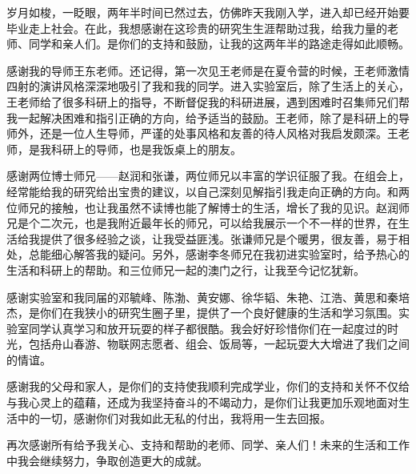 \begin{thanks}
岁月如梭，一眨眼，两年半时间已然过去，仿佛昨天我刚入学，进入却已经开始要毕业走上社会。在此，我想感谢在这珍贵的研究生生涯帮助过我，给我力量的老师、同学和亲人们。是你们的支持和鼓励，让我的这两年半的路途走得如此顺畅。

感谢我的导师王东老师。还记得，第一次见王老师是在夏令营的时候，王老师激情四射的演讲风格深深地吸引了我和我的同学。进入实验室后，除了生活上的关心，王老师给了很多科研上的指导，不断督促我的科研进展，遇到困难时召集师兄们帮我一起解决困难和指引正确的方向，给予适当的鼓励。王老师，除了是科研上的导师外，还是一位人生导师，严谨的处事风格和友善的待人风格对我启发颇深。王老师，是我科研上的导师，也是我饭桌上的朋友。

感谢两位博士师兄——赵润和张谦，两位师兄以丰富的学识征服了我。在组会上，经常能给我的研究给出宝贵的建议，以自己深刻见解指引我走向正确的方向。和两位师兄的接触，也让我虽然不读博也能了解博士的生活，增长了我的见识。赵润师兄是个二次元，也是我附近最年长的师兄，可以给我展示一个不一样的世界，在生活给我提供了很多经验之谈，让我受益匪浅。张谦师兄是个暖男，很友善，易于相处，总能细心解答我的疑问。另外，感谢李冬师兄在我初进实验室时，给予热心的生活和科研上的帮助。和三位师兄一起的澳门之行，让我至今记忆犹新。

感谢实验室和我同届的邓毓峰、陈渤、黄安娜、徐华韬、朱艳、江浩、黄思和秦培杰，是你们在我狭小的研究生圈子里，提供了一个良好健康的生活和学习氛围。实验室同学认真学习和放开玩耍的样子都很酷。我会好好珍惜你们在一起度过的时光，包括舟山春游、物联网志愿者、组会、饭局等，一起玩耍大大增进了我们之间的情谊。

感谢我的父母和家人，是你们的支持使我顺利完成学业，你们的支持和关怀不仅给与我心灵上的蕴藉，还成为我坚持奋斗的不竭动力，是你们让我更加乐观地面对生活中的一切，感谢你们对我如此无私的付出，我将用一生去回报。

再次感谢所有给予我关心、支持和帮助的老师、同学、亲人们！未来的生活和工作中我会继续努力，争取创造更大的成就。

\end{thanks}
